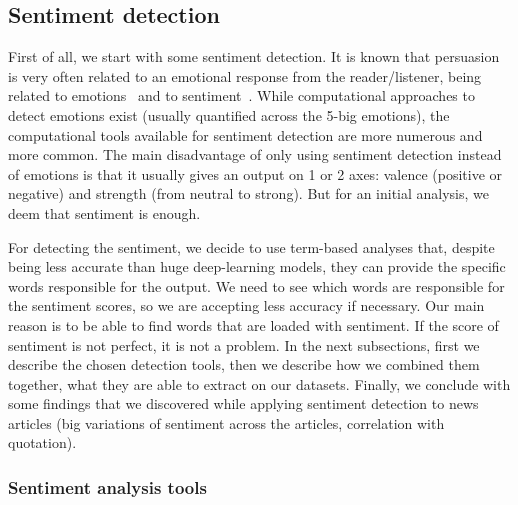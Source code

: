 \subsection{\statusorange Sentiment detection}
\label{ssec:lp_techniques_sentiment}

First of all, we start with some sentiment detection. It is known that persuasion is very often related to an emotional response from the reader/listener, being related to emotions~\citep{rocklage2018persuasion,petty2015emotion,desteno2004discrete} and to sentiment~\citep{gatti2014sentiment}.
While computational approaches to detect emotions exist (usually quantified across the 5-big emotions), the computational tools available for sentiment detection are more numerous and more common. The main disadvantage of only using sentiment detection instead of emotions is that it usually gives an output on 1 or 2 axes: valence (positive or negative) and strength (from neutral to strong). But for an initial analysis, we deem that sentiment is enough.

For detecting the sentiment, we decide to use term-based analyses that, despite being less accurate than huge deep-learning models, %
they can provide the specific words responsible for the output. We need to see which words are responsible for the sentiment scores, so we are accepting less accuracy if necessary. Our main reason is to be able to find words that are loaded with sentiment. If the score of sentiment is not perfect, it is not a problem. 
In the next subsections, first we describe the chosen detection tools, then we describe how we combined them together, what they are able to extract on our datasets. Finally, we conclude with some findings that we discovered while applying sentiment detection to news articles (big variations of sentiment across the articles, correlation with quotation).

\subsubsection{\statusgreen Sentiment analysis tools}

